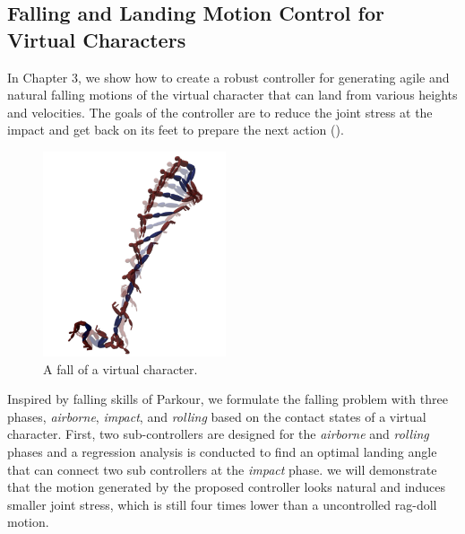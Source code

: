 \subsection{Falling and Landing Motion Control for Virtual Characters}

In Chapter 3, we show how to create a robust controller for generating 
agile and natural falling motions of the virtual character that can land from 
various heights and velocities.
The goals of the controller are to reduce the joint stress at the impact and
get back on its feet to prepare the next action ().

\begin{figure}
 \vspace{-25pt}
  \begin{center}
    \includegraphics[width=0.48\textwidth]{images/intro_falling_sequence.png}
  \end{center}
   \vspace{-25pt}
  \caption{A fall of a virtual character.}
  \label{fig:intro_landing}
   \vspace{-10pt}
\end{figure}

Inspired by falling skills of Parkour, 
we formulate the falling problem
with three phases, \emph{airborne}, \emph{impact}, and \emph{rolling}
based on the contact states of a virtual character.
First, two sub-controllers are designed for the \emph{airborne} and
\emph{rolling} phases and a regression analysis is conducted to find 
an optimal landing angle that can connect two sub controllers at the
\emph{impact} phase.
we will demonstrate that the motion generated by the proposed controller
looks natural and induces smaller joint stress, which is still four times lower
than a uncontrolled rag-doll motion.


